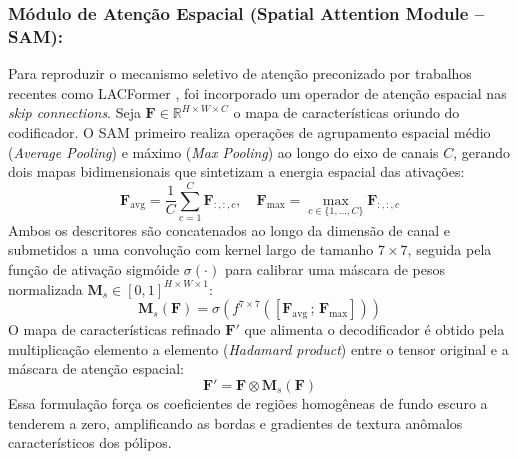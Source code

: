 \subsubsection{M\'{o}dulo de Aten\c{c}\~{a}o Espacial (Spatial Attention Module -- SAM):}
Para reproduzir o mecanismo seletivo de aten\c{c}\~{a}o preconizado por trabalhos recentes como LACFormer \cite{lacformer2023}, foi incorporado um operador de aten\c{c}\~{a}o espacial nas \textit{skip connections}. Seja $\mathbf{F} \in \mathbb{R}^{H \times W \times C}$ o mapa de caracter\'{i}sticas oriundo do codificador. O SAM primeiro realiza opera\c{c}\~{o}es de agrupamento espacial m\'{e}dio (\textit{Average Pooling}) e m\'{a}ximo (\textit{Max Pooling}) ao longo do eixo de canais $C$, gerando dois mapas bidimensionais que sintetizam a energia espacial das ativa\c{c}\~{o}es:
\begin{equation}
    \mathbf{F}_{\text{avg}} = \frac{1}{C}\sum_{c=1}^{C} \mathbf{F}_{:,:,c}, \quad \mathbf{F}_{\text{max}} = \max_{c \in \{1,\dots,C\}} \mathbf{F}_{:,:,c}
\end{equation}
Ambos os descritores s\~{a}o concatenados ao longo da dimens\~{a}o de canal e submetidos a uma convolu\c{c}\~{a}o com kernel largo de tamanho $7 \times 7$, seguida pela fun\c{c}\~{a}o de ativa\c{c}\~{a}o sigm\'{o}ide $\sigma(\cdot)$ para calibrar uma m\'{a}scara de pesos normalizada $\mathbf{M}_s \in [0, 1]^{H \times W \times 1}$:
\begin{equation}
    \mathbf{M}_s(\mathbf{F}) = \sigma \left( f^{7 \times 7} \left( [ \mathbf{F}_{\text{avg}} \, ; \, \mathbf{F}_{\text{max}} ] \right) \right)
\end{equation}
O mapa de caracter\'{i}sticas refinado $\mathbf{F}'$ que alimenta o decodificador \'{e} obtido pela multiplica\c{c}\~{a}o elemento a elemento (\textit{Hadamard product}) entre o tensor original e a m\'{a}scara de aten\c{c}\~{a}o espacial:
\begin{equation}
    \mathbf{F}' = \mathbf{F} \otimes \mathbf{M}_s(\mathbf{F})
\end{equation}
Essa formula\c{c}\~{a}o força os coeficientes de regi\~{o}es homog\^{e}neas de fundo escuro a tenderem a zero, amplificando as bordas e gradientes de textura an\^{o}malos caracter\'{i}sticos dos p\'{o}lipos.

